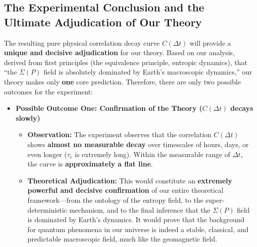 \documentclass[11pt]{article}
\begin{document}
\subsection{The Experimental Conclusion and the Ultimate Adjudication of Our Theory}

The resulting pure physical correlation decay curve $C(\Delta t)$ will provide a \textbf{unique and decisive adjudication} for our theory. Based on our analysis, derived from first principles (the equivalence principle, entropic dynamics), that ``the $\Sigma(P)$ field is absolutely dominated by Earth's macroscopic dynamics,'' our theory makes only \textbf{one} core prediction. Therefore, there are only two possible outcomes for the experiment:

\begin{itemize}
    \item   \textbf{Possible Outcome One: Confirmation of the Theory ($C(\Delta t)$ decays slowly)}
        \begin{itemize}
            \item   \textbf{Observation:} The experiment observes that the correlation $C(\Delta t)$ shows \textbf{almost no measurable decay} over timescales of hours, days, or even longer ($\tau_c$ is extremely long). Within the measurable range of $\Delta t$, the curve is \textbf{approximately a flat line}.
            \item   \textbf{Theoretical Adjudication:} This would constitute an \textbf{extremely powerful and decisive confirmation} of our entire theoretical framework—from the ontology of the entropy field, to the super-deterministic mechanism, and to the final inference that the $\Sigma(P)$ field is dominated by Earth's dynamics. It would prove that the background for quantum phenomena in our universe is indeed a stable, classical, and predictable macroscopic field, much like the geomagnetic field.
        \end{itemize}


\end{itemize}
\end{document}
